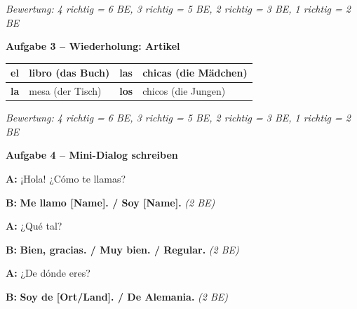 \documentclass[11pt, a4paper]{article}
\newcommand{\punktebox}[1]{\hfill\fbox{\small \_\_\_/#1}}
\newcommand{\lsg}[1]{\textcolor{loesung}{\textbf{#1}}}
\begin{document}
\vspace{5pt}
\textit{Bewertung: 4 richtig = 6 BE, 3 richtig = 5 BE, 2 richtig = 3 BE, 1 richtig = 2 BE}

\vspace{15pt}


\noindent\textbf{\textcolor{spanisch}{Aufgabe 3 -- Wiederholung: Artikel}} \punktebox{6}

\vspace{10pt}

\begin{tabularx}{\textwidth}{|l|X|l|X|}
\hline
\lsg{el} & libro (das Buch) & \lsg{las} & chicas (die Mädchen) \\
\hline
\lsg{la} & mesa (der Tisch) & \lsg{los} & chicos (die Jungen) \\
\hline
\end{tabularx}

\vspace{5pt}
\textit{Bewertung: 4 richtig = 6 BE, 3 richtig = 5 BE, 2 richtig = 3 BE, 1 richtig = 2 BE}

\vspace{15pt}


\noindent\textbf{\textcolor{spanisch}{Aufgabe 4 -- Mini-Dialog schreiben}} \punktebox{6}

\vspace{10pt}

\noindent
\textbf{A:} ¡Hola! ¿Cómo te llamas?

\vspace{0.4em}
\noindent
\textbf{B:} \lsg{Me llamo [Name]. / Soy [Name].} \hfill \textit{(2 BE)}

\vspace{0.6em}
\noindent
\textbf{A:} ¿Qué tal?

\vspace{0.4em}
\noindent
\textbf{B:} \lsg{Bien, gracias. / Muy bien. / Regular.} \hfill \textit{(2 BE)}

\vspace{0.6em}
\noindent
\textbf{A:} ¿De dónde eres?

\vspace{0.4em}
\noindent
\textbf{B:} \lsg{Soy de [Ort/Land]. / De Alemania.} \hfill \textit{(2 BE)}
\end{document}
